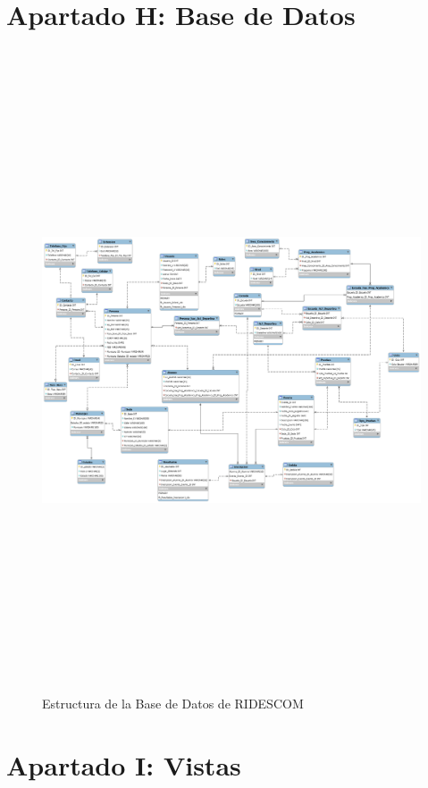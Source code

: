	\chapter{Apartado H: Base de Datos}
		\label{BasedeDatos}
		\begin{figure}[hbt!]
			\centering
			\includegraphics[angle=90, width=14cm, height=19cm]{Imagenes/RIDESCOM.png}
			\caption{Estructura de la Base de Datos de RIDESCOM}
			\label{BaseDatos}
		\end{figure}
		
		
	
	\pagebreak
		
	\chapter{Apartado I: Vistas}
		
